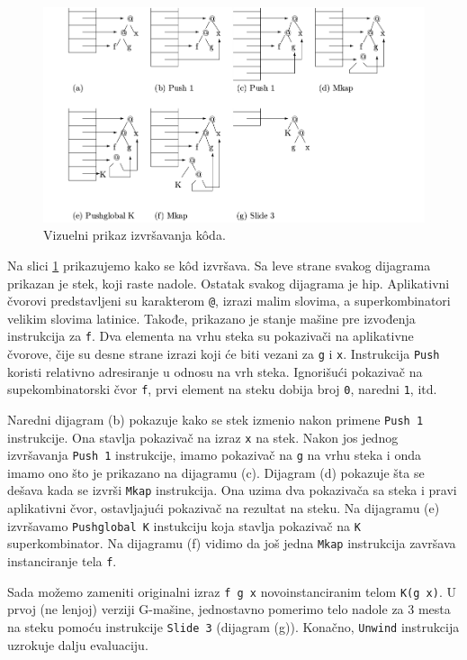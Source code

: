 \begin{figure}[h!]
	\centering
	\includegraphics[scale=0.35]{primerGmasine.png}
	
	\caption{Vizuelni prikaz izvršavanja k\^ oda.}
	\label{fig:primerGmasine}
\end{figure}

Na slici \ref{fig:primerGmasine} prikazujemo kako se k\^ od izvršava. Sa leve strane svakog dijagrama prikazan je stek, koji raste nadole. Ostatak svakog dijagrama je hip. Aplikativni čvorovi predstavljeni su karakterom \verb|@|, izrazi malim slovima, a superkombinatori velikim slovima latinice. Takođe, prikazano je stanje mašine pre izvođenja instrukcija za \verb|f|. Dva elementa na vrhu steka su pokazivači na aplikativne čvorove, čije su desne strane izrazi koji će biti vezani za \verb|g| i \verb|x|. Instrukcija \verb|Push| koristi relativno adresiranje u odnosu na vrh steka. Ignorišući pokazivač na supekombinatorski čvor \verb|f|, prvi element na steku dobija broj \verb|0|, naredni \verb|1|, itd.

Naredni dijagram (b) pokazuje kako se stek izmenio nakon primene \verb|Push 1| instrukcije. Ona stavlja pokazivač na izraz \verb|x| na stek. Nakon jos jednog izvršavanja \verb|Push 1| instrukcije, imamo pokazivač na \verb|g| na vrhu steka i onda imamo ono što je prikazano na dijagramu (c). Dijagram (d) pokazuje šta se dešava kada se izvrši \verb|Mkap| instrukcija. Ona uzima dva pokazivača sa steka i pravi aplikativni čvor, ostavljajući pokazivač na rezultat na steku. Na dijagramu (e) izvršavamo \verb|Pushglobal K| instukciju koja stavlja pokazivač na \verb|K| superkombinator. Na dijagramu (f) vidimo da još jedna \verb|Mkap| instrukcija završava instanciranje tela \verb|f|. 

Sada možemo zameniti originalni izraz \verb|f g x| novoinstanciranim telom \verb|K(g x)|. U prvoj (ne lenjoj) verziji G-mašine, jednostavno pomerimo telo nadole za 3 mesta na steku pomoću instrukcije \verb|Slide 3| (dijagram (g)). Konačno, \verb|Unwind| instrukcija uzrokuje dalju evaluaciju.

